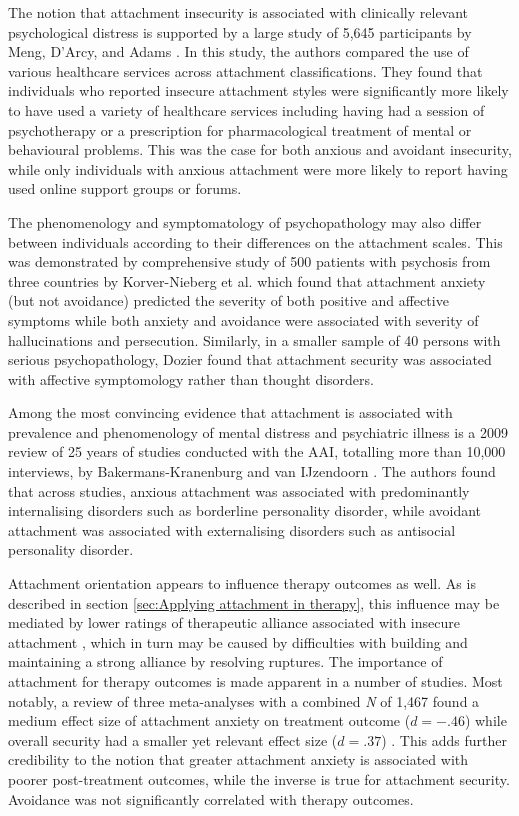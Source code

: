 \documentclass[12pt]{report}
\begin{document}
The notion that attachment insecurity is associated with clinically relevant psychological distress is supported by a large study of 5,645 participants by Meng, D'Arcy, and Adams \cite{Meng2015}.
In this study, the authors compared the use of various healthcare services across attachment classifications. They found that individuals who reported insecure attachment styles were significantly more likely to have used a variety of healthcare services including having had a session of psychotherapy or a prescription for pharmacological treatment of mental or behavioural problems. This was the case for both anxious and avoidant insecurity, while only individuals with anxious attachment were more likely to report having used online support groups or forums.

The phenomenology and symptomatology of psychopathology may also differ between individuals according to their differences on the attachment scales.
This was demonstrated by comprehensive study of 500 patients with psychosis from three countries by Korver-Nieberg et al. \cite{Korver-Nieberg2015} which found that attachment anxiety (but not avoidance) predicted the severity of both positive and affective symptoms while both anxiety and avoidance were associated with severity of hallucinations and persecution.
Similarly, in a smaller sample of 40 persons with serious psychopathology, Dozier \cite{Dozier1990} found that attachment security was associated with affective symptomology rather than thought disorders.

Among the most convincing evidence that attachment is associated with prevalence and phenomenology of mental distress and psychiatric illness is a 2009 review of 25 years of studies conducted with the AAI, totalling more than 10,000 interviews, by Bakermans-Kranenburg and van IJzendoorn \cite{Bakermanskranenburg2009}.
The authors found that across studies, anxious attachment was associated with predominantly internalising disorders such as borderline personality disorder, while avoidant attachment was associated with externalising disorders such as antisocial personality disorder.

Attachment orientation appears to influence therapy outcomes as well. As is described in section \ref{sec:Applying attachment in therapy}, this influence may be mediated by lower ratings of therapeutic alliance associated with insecure attachment \cite{Baier2020}, which in turn may be caused by difficulties with building and maintaining a strong alliance by resolving ruptures.
The importance of attachment for therapy outcomes is made apparent in a number of studies. Most notably, a review of three meta-analyses with a combined \textit{N} of 1,467 found a medium effect size of attachment anxiety on treatment outcome ($d=-.46$) while overall security had a smaller yet relevant effect size ($d=.37$) \cite{Levy2011}. This adds further credibility to the notion that greater attachment anxiety is associated with poorer post-treatment outcomes, while the inverse is true for attachment security. Avoidance was not significantly correlated with therapy outcomes.
\end{document}
